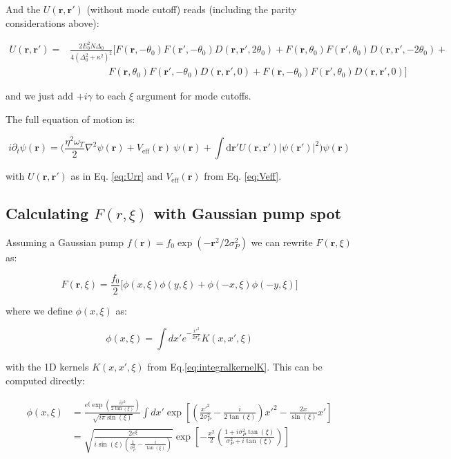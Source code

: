 \documentclass[a4paper,nobalancelastpage]{revtex4-1}
\newcommand{\vect}[1]{\bm{#1}}
\newcommand{\abs}[1]{\lvert #1 \rvert}
\begin{document}
And the $U(\vect{r},\vect{r}')$ (without mode cutoff) reads (including the parity considerations above):

\begin{align}
\label{eq:Urr}
U(\vect{r},\vect{r}')=&\frac{ 2E^2_0 N \Delta_0 }{4(\Delta_0^2+\kappa^2)^2} 
\bigg[
F(\vect{r},-\theta_0)F(\vect{r}',-\theta_0)D(\vect{r},\vect{r}',2\theta_0) 
+ F(\vect{r},\theta_0)F(\vect{r}',\theta_0)D(\vect{r},\vect{r}',-2\theta_0) +\nonumber \\ &  \qquad \qquad 
F(\vect{r},\theta_0)F(\vect{r}',-\theta_0)D(\vect{r},\vect{r}',0)
+ F(\vect{r},-\theta_0)F(\vect{r}',\theta_0)D(\vect{r},\vect{r}',0)
\bigg]
\end{align}

and we just add $+i\gamma$ to each $\xi$ argument for mode cutoffs.

The full equation of motion is:

\begin{equation}
i \partial_t \psi(\vect{r})= \bigg( 
\frac{\eta^2 \omega_T}{2}\nabla^2 \psi(\vect{r}) + V_{\text{eff}} (\vect{r}) \ \psi(\vect{r})+\int \mathrm{d} \vect{r}' U(\vect{r},\vect{r}') \abs{\psi(\vect{r}')}^2
\bigg) \psi(\vect{r})
\end{equation}

with $U(\vect{r},\vect{r}')$ as in Eq. \ref{eq:Urr} and $V_{\text{eff}}(\vect{r})$ from Eq. \ref{eq:Veff}.

\subsection{Calculating $F(r,\xi)$ with Gaussian pump spot}

Assuming a Gaussian pump $f(\vect{r})=f_0 \exp{(-\vect{r}^2/2\sigma_P^2)}$ we can rewrite $F(\textbf{r},\xi)$ as:

\begin{equation}
F(\textbf{r},\xi)=\frac{f_0}{2} \bigg[ 
\phi(x,\xi)\phi(y,\xi)+\phi(-x,\xi)\phi(-y,\xi)
\bigg]
\end{equation}

where we define $\phi(x,\xi)$ as:

\begin{equation}
\phi(x,\xi)=\int dx' e^{-\frac{x'^2}{2 \sigma_P^2}} K(x,x',\xi)
\end{equation}

with the 1D kernels $K(x,x',\xi)$ from Eq.\ref{eq:integralkernelK}. This can be computed directly:

\begin{align}
\phi(x,\xi) &=\frac{e^{\xi}\exp{\left(\frac{i x^2}{2 \tan(\xi)} \right) }}
{\sqrt{i \pi \sin(\xi)}}  \int dx' \exp{\left[ 
\left( \frac{x'^2}{2 \sigma_P^2}-\frac{i }{2 \tan(\xi)} 
\right) x'^2
-\frac{2 x }{\sin(\xi)}x'
\right] } \nonumber \\
&=
\sqrt{\frac{2 e^{\xi}}{i \sin(\xi) \left( \frac{1}{\sigma_P^2}-\frac{i}{\tan(\xi)} \right)}}
\exp{\left[ -\frac{x^2}{2} \left( \frac{1+i \sigma_P^2 \tan(\xi)}{\sigma_P^2+i \tan(\xi)}  \right) \right]}
\end{align}
\end{document}
